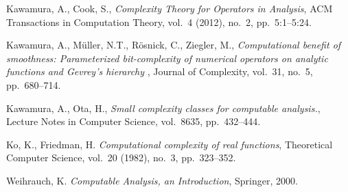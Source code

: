 \documentclass{llncs}
\begin{document}
\begin{thebibliography}{10}
\providecommand{\url}[1]{\texttt{#1}}
\providecommand{\urlprefix}{URL }


  Kawamura, A., Cook, S.,
  {\it Complexity Theory for Operators in Analysis},
  ACM Transactions in Computation Theory,
vol.~4 (2012), no.~2, pp.~5:1--5:24.

  Kawamura, A., M{\"u}ller, N.T., R{\"o}snick, C., Ziegler, M.,
  {\it Computational benefit of smoothness: Parameterized bit-complexity of numerical operators on analytic functions and Gevrey’s hierarchy },
 Journal of Complexity, 
vol.~31, no.~5, pp.~680--714.

  Kawamura, A., Ota, H.,
  {\it Small complexity classes for computable analysis.},
  Lecture Notes in Computer Science,
  vol.~8635,  pp.~432--444.

  Ko, K., Friedman, H.
  {\it Computational complexity of real functions},
Theoretical Computer Science,
vol.~20 (1982), no.~3, pp.~323--352.

Weihrauch, K.
{\it Computable Analysis, an Introduction},
Springer,
2000.
\end{thebibliography}
\end{document}
